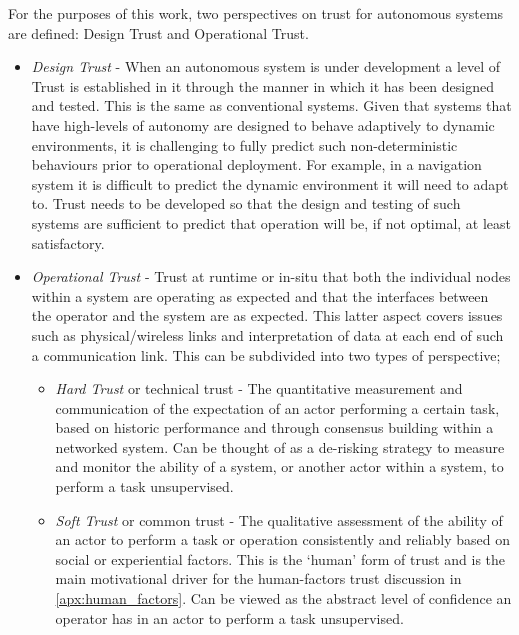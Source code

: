 For the purposes of this work, two perspectives on trust for autonomous systems are defined: Design Trust and Operational Trust.

\begin{itemize}
  \item \emph{Design Trust} - When an autonomous system is under development a level of Trust is established in it through the manner in which it has been designed and tested.
    This is the same as conventional systems.
    Given that systems that have high-levels of autonomy are designed to behave adaptively to dynamic environments, it is challenging to fully predict such non-deterministic behaviours prior to operational deployment.
    For example, in a navigation system it is difficult to predict the dynamic environment it will need to adapt to.
    Trust needs to be developed so that the design and testing of such systems are sufficient to predict that operation will be, if not optimal, at least satisfactory.

  \item \emph{Operational Trust} - Trust at runtime or in-situ that both the individual nodes within a system are operating as expected and that the interfaces between the operator and the system are as expected.
    This latter aspect covers issues such as physical/wireless links and interpretation of data at each end of such a communication link.
    This can be subdivided into two types of perspective;
    \begin{itemize}
      \item \emph{Hard Trust} or technical trust - The quantitative measurement and communication of the expectation of an actor performing a certain task, based on historic performance and through consensus building within a networked system.
    Can be thought of as a de-risking strategy to measure and monitor the ability of a system, or another actor within a system, to perform a task unsupervised.
  \item \emph{Soft Trust} or common trust - The qualitative assessment of the ability of an actor to perform a task or operation consistently and reliably based on social or experiential factors.
    This is the ‘human’ form of trust and is the main motivational driver for the human-factors trust discussion in \autoref{apx:human_factors}.
    Can be viewed as the abstract level of confidence an operator has in an actor to perform a task unsupervised.
    \end{itemize}
\end{itemize}

